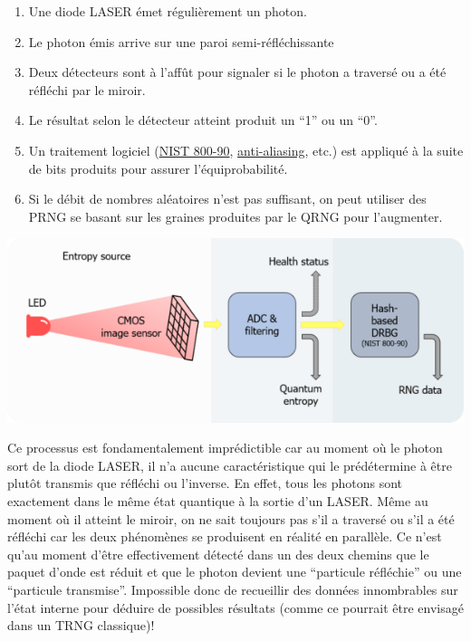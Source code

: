 \documentclass{scrartcl}
\begin{document}
\begin{enumerate}
\item Une diode LASER émet régulièrement un photon.
\item Le photon émis arrive sur une paroi semi-réfléchissante
\item Deux détecteurs sont à l'affût pour signaler si le photon a traversé ou a été réfléchi par le miroir.
\item Le résultat selon le détecteur atteint produit un “1” ou un “0”.
\item Un traitement logiciel (\href{https://nvlpubs.nist.gov/nistpubs/Legacy/SP/nistspecialpublication800-90r.pdf}{NIST 800-90}, \href{https://content.iospress.com/download/computability/com001?id=computability\%2Fcom001}{anti-aliasing}, etc.) est appliqué à la suite de bits produits pour assurer l’équiprobabilité.
\item Si le débit de nombres aléatoires n’est pas suffisant, on peut utiliser des PRNG se basant sur les graines produites par le QRNG pour l’augmenter.
\end{enumerate}
\begin{center}
  \includegraphics[scale=0.5]{img/QRNG-core-technology-600x242.png}  
\end{center}

Ce processus est fondamentalement imprédictible car au moment où le photon sort de la diode LASER, il n’a aucune caractéristique qui le prédétermine à être plutôt transmis que réfléchi ou l’inverse. En effet, tous les photons sont exactement dans le même état quantique à la sortie d'un LASER. Même au moment où il atteint le miroir, on ne sait toujours pas s’il a traversé ou s’il a été réfléchi car les deux phénomènes se produisent en réalité en parallèle. Ce n’est qu’au moment d’être effectivement détecté dans un des deux chemins que le paquet d’onde est réduit et que le photon devient une “particule réfléchie” ou une “particule transmise”. Impossible donc de recueillir des données innombrables sur l’état interne pour déduire de possibles résultats (comme ce pourrait être envisagé dans un TRNG classique)!
\end{document}
